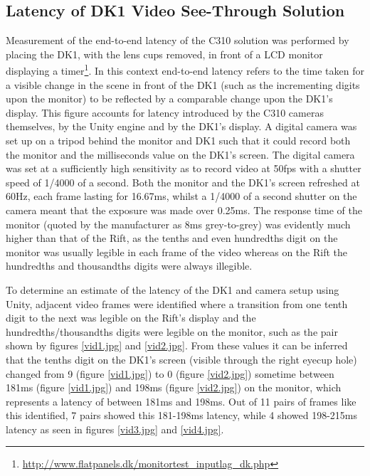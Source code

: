 
\subsection{Latency of DK1 Video See-Through Solution}

Measurement of the end-to-end latency of the C310 solution was performed by placing the DK1, with the lens cups removed, in front of a LCD monitor displaying a timer\footnote{\url{http://www.flatpanels.dk/monitortest_inputlag_dk.php}}. In this context end-to-end latency refers to the time taken for a visible change in the scene in front of the DK1 (such as the incrementing digits upon the monitor) to be reflected by a comparable change upon the DK1's display. This figure accounts for latency introduced by the C310 cameras themselves, by the Unity engine and by the DK1's display. A digital camera was set up on a tripod behind the monitor and DK1 such that it could record both the monitor and the milliseconds value on the DK1's screen. The digital camera was set at a sufficiently high sensitivity as to record video at 50fps with a shutter speed of 1/4000 of a second. Both the monitor and the DK1's screen refreshed at 60Hz, each frame lasting for 16.67ms, whilst a 1/4000 of a second shutter on the camera meant that the exposure was made over 0.25ms. The response time of the monitor (quoted by the manufacturer as 8ms grey-to-grey) was evidently much higher than that of the Rift, as the tenths and even hundredths digit on the monitor was usually legible in each frame of the video whereas on the Rift the hundredths and thousandths digits were always illegible.

To determine an estimate of the latency of the DK1 and camera setup using Unity, adjacent video frames were identified where a transition from one tenth digit to the next was legible on the Rift's display and the hundredths/thousandths digits were legible on the monitor, such as the pair shown by figures \ref{vid1.jpg} and \ref{vid2.jpg}. From these values it can be inferred that the tenths digit on the DK1's screen (visible through the right eyecup hole) changed from 9 (figure \ref{vid1.jpg}) to 0 (figure \ref{vid2.jpg}) sometime between 181ms (figure \ref{vid1.jpg}) and 198ms (figure \ref{vid2.jpg}) on the monitor, which represents a latency of between 181ms and 198ms. Out of 11 pairs of frames like this identified, 7 pairs showed this 181-198ms latency, while 4 showed 198-215ms latency as seen in figures \ref{vid3.jpg} and \ref{vid4.jpg}.

